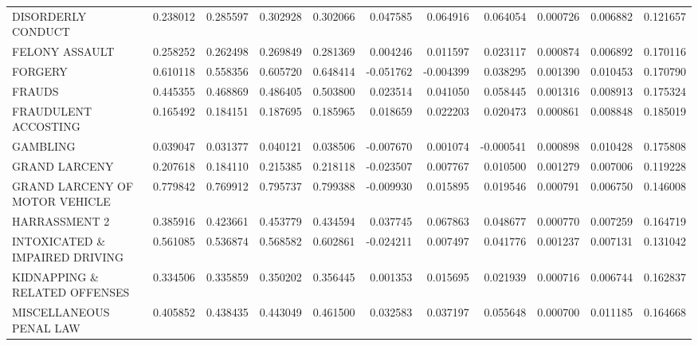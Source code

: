 \begin{tabular}{lrrrrrrrrrr}
DISORDERLY CONDUCT              &     0.238012 &  0.285597 &   0.302928 &   0.302066 &     0.047585 &        0.064916 &        0.064054 &  0.000726 &     0.006882 &     0.121657 \\
FELONY ASSAULT                  &     0.258252 &  0.262498 &   0.269849 &   0.281369 &     0.004246 &        0.011597 &        0.023117 &  0.000874 &     0.006892 &     0.170116 \\
FORGERY                         &     0.610118 &  0.558356 &   0.605720 &   0.648414 &    -0.051762 &       -0.004399 &        0.038295 &  0.001390 &     0.010453 &     0.170790 \\
FRAUDS                          &     0.445355 &  0.468869 &   0.486405 &   0.503800 &     0.023514 &        0.041050 &        0.058445 &  0.001316 &     0.008913 &     0.175324 \\
FRAUDULENT ACCOSTING            &     0.165492 &  0.184151 &   0.187695 &   0.185965 &     0.018659 &        0.022203 &        0.020473 &  0.000861 &     0.008848 &     0.185019 \\
GAMBLING                        &     0.039047 &  0.031377 &   0.040121 &   0.038506 &    -0.007670 &        0.001074 &       -0.000541 &  0.000898 &     0.010428 &     0.175808 \\
GRAND LARCENY                   &     0.207618 &  0.184110 &   0.215385 &   0.218118 &    -0.023507 &        0.007767 &        0.010500 &  0.001279 &     0.007006 &     0.119228 \\
GRAND LARCENY OF MOTOR VEHICLE  &     0.779842 &  0.769912 &   0.795737 &   0.799388 &    -0.009930 &        0.015895 &        0.019546 &  0.000791 &     0.006750 &     0.146008 \\
HARRASSMENT 2                   &     0.385916 &  0.423661 &   0.453779 &   0.434594 &     0.037745 &        0.067863 &        0.048677 &  0.000770 &     0.007259 &     0.164719 \\
INTOXICATED \& IMPAIRED DRIVING  &     0.561085 &  0.536874 &   0.568582 &   0.602861 &    -0.024211 &        0.007497 &        0.041776 &  0.001237 &     0.007131 &     0.131042 \\
KIDNAPPING \& RELATED OFFENSES   &     0.334506 &  0.335859 &   0.350202 &   0.356445 &     0.001353 &        0.015695 &        0.021939 &  0.000716 &     0.006744 &     0.162837 \\
MISCELLANEOUS PENAL LAW         &     0.405852 &  0.438435 &   0.443049 &   0.461500 &     0.032583 &        0.037197 &        0.055648 &  0.000700 &     0.011185 &     0.164668 \\

\end{tabular}
